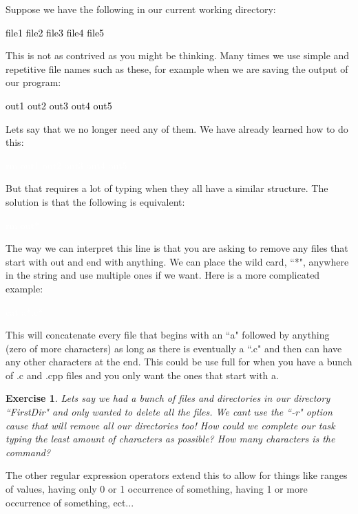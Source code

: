 \documentclass[oneside]{book}
\newcommand{\commandline}[1]{\begin{center} \colorbox{Dark}{\textcolor{white}{#1}} \end{center}}
\newcommand{\exampleout}[1]{\begin{center} \colorbox{Light}{\textcolor{black}{#1}} \end{center}}
\newtheorem{ex}{Exercise}[chapter]
\begin{document}
    Suppose we have the following in our current working directory:
    \exampleout{file1 file2 file3 file4 file5}
    This is not as contrived as you might be thinking. Many times we use simple and repetitive file names such as these, for example when we are saving the output of our program:
    \exampleout{out1 out2 out3 out4 out5}
    Lets say that we no longer need any of them. We have already learned how to do this:
    \commandline{rm out1 out2 out3 out4 out5}
    But that requires a lot of typing when they all have a similar structure. The solution is that the following is equivalent:
    \commandline{rm out*}
    The way we can interpret this line is that you are asking to remove any files that start with out and end with anything. We can place the wild card, ``*", anywhere in the string and use multiple ones if we want. Here is a more complicated example:
    \commandline{cat a*.c*}
    This will concatenate every file that begins with an ``a" followed by anything (zero of more characters) as long as there is eventually a ``.c" and then can have any other characters at the end. This could be use full for when you have a bunch of .c and .cpp files and you only want the ones that start with a.
    \begin{ex}
        Lets say we had a bunch of files and directories in our directory ``FirstDir" and only wanted to delete all the files. We cant use the ``-r" option cause that will remove all our directories too! How could we complete our task typing the least amount of characters as possible? How many characters is the command?
    \end{ex}
    The other regular expression operators extend this to allow for things like ranges of values, having only 0 or 1 occurrence of something, having 1 or more occurrence of something, ect... 
\end{document}
